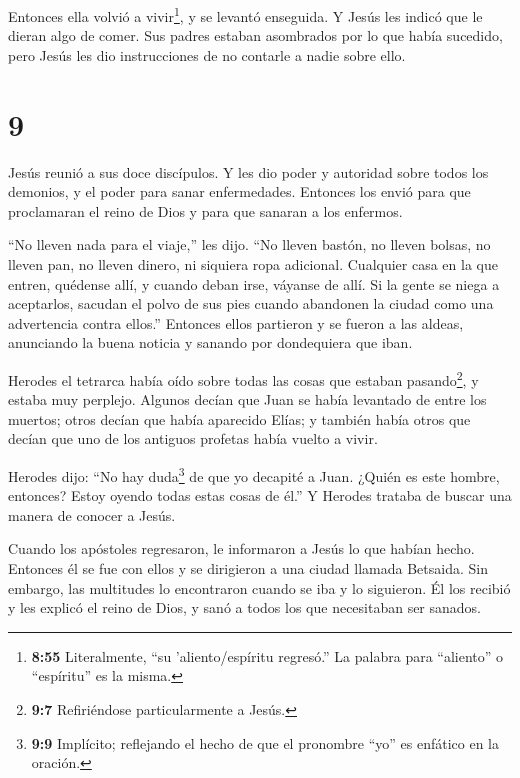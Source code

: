  Entonces ella volvió a vivir\footnote{\textbf{8:55}
  Literalmente, ``su 'aliento/espíritu regresó.'' La palabra para
  ``aliento'' o ``espíritu'' es la misma.}, y se levantó enseguida. Y
Jesús les indicó que le dieran algo de comer.  Sus padres
estaban asombrados por lo que había sucedido, pero Jesús les dio
instrucciones de no contarle a nadie sobre ello.

\hypertarget{section-8}{%
\section{9}\label{section-8}}

 Jesús reunió a sus doce discípulos. Y les dio poder y
autoridad sobre todos los demonios, y el poder para sanar enfermedades.
 Entonces los envió para que proclamaran el reino de Dios y
para que sanaran a los enfermos.

 ``No lleven nada para el viaje,'' les dijo. ``No lleven
bastón, no lleven bolsas, no lleven pan, no lleven dinero, ni siquiera
ropa adicional.  Cualquier casa en la que entren, quédense
allí, y cuando deban irse, váyanse de allí.  Si la gente se
niega a aceptarlos, sacudan el polvo de sus pies cuando abandonen la
ciudad como una advertencia contra ellos.''  Entonces ellos
partieron y se fueron a las aldeas, anunciando la buena noticia y
sanando por dondequiera que iban.

 Herodes el tetrarca había oído sobre todas las cosas que
estaban pasando\footnote{\textbf{9:7} Refiriéndose particularmente a
  Jesús.}, y estaba muy perplejo. Algunos decían que Juan se había
levantado de entre los muertos;  otros decían que había
aparecido Elías; y también había otros que decían que uno de los
antiguos profetas había vuelto a vivir.

 Herodes dijo: ``No hay duda\footnote{\textbf{9:9}
  Implícito; reflejando el hecho de que el pronombre ``yo'' es enfático
  en la oración.} de que yo decapité a Juan. ¿Quién es este hombre,
entonces? Estoy oyendo todas estas cosas de él.'' Y Herodes trataba de
buscar una manera de conocer a Jesús.

 Cuando los apóstoles regresaron, le informaron a Jesús lo
que habían hecho. Entonces él se fue con ellos y se dirigieron a una
ciudad llamada Betsaida.  Sin embargo, las multitudes lo
encontraron cuando se iba y lo siguieron. Él los recibió y les explicó
el reino de Dios, y sanó a todos los que necesitaban ser sanados.

